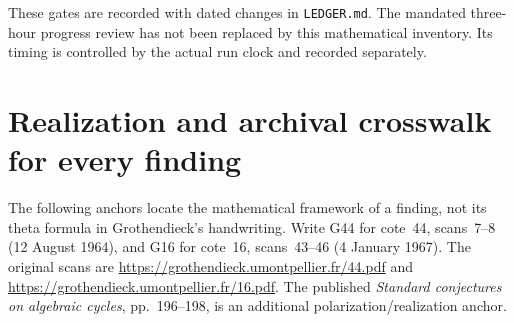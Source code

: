 \documentclass[11pt]{article}
\theoremstyle{definition}\newtheorem{definition}[theorem]{Definition}\newtheorem{remark}[theorem]{Remark}
\begin{document}
These gates are recorded with dated changes in \texttt{LEDGER.md}.
The mandated three-hour progress review has not been replaced by
this mathematical inventory. Its timing is controlled by the actual
run clock and recorded separately.


\appendix
\section{Realization and archival crosswalk for every finding}

The following anchors locate the mathematical framework of a
finding, not its theta formula in Grothendieck's handwriting.
Write G44 for cote~44, scans~7--8 (12 August 1964), and G16 for
cote~16, scans~43--46 (4 January 1967). The original scans are
\url{https://grothendieck.umontpellier.fr/44.pdf} and
\url{https://grothendieck.umontpellier.fr/16.pdf}.
The published \emph{Standard conjectures on algebraic cycles},
pp.~196--198, is an additional polarization/realization anchor.
\end{document}
